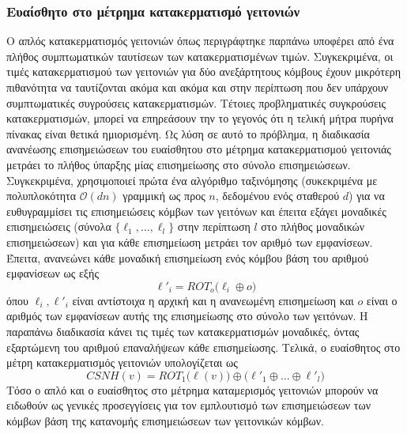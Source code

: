 \subsubsection{Ευαίσθητο στο μέτρημα κατακερματισμό γειτονιών}
Ο απλός κατακερματισμός γειτονιών όπως περιγράφτηκε παρπάνω υποφέρει από ένα πλήθος συμπτωματικών ταυτίσεων των κατακερματισμένων τιμών.
Συγκεκριμένα, οι τιμές κατακερματισμού των γειτονιών για δύο ανεξάρτητους κόμβους έχουν μικρότερη πιθανότητα να ταυτίζονται ακόμα και ακόμα και στην περίπτωση που δεν υπάρχουν συμπτωματικές συγρούσεις κατακερματισμών.
Τέτοιες προβληματικές συγκρούσεις κατακερματισμών, μπορεί να επηρεάσουν την το γεγονός ότι η τελική μήτρα πυρήνα πίνακας είναι θετικά ημιορισμένη.
Ως λύση σε αυτό το πρόβλημα, η διαδικασία ανανέωσης επισημειώσεων του ευαίσθητου στο μέτρημα κατακερματισμού γειτονιάς μετράει το πλήθος ύπαρξης μίας επισημείωσης στο σύνολο επισημειώσεων.
Συγκεκριμένα, χρησιμοποιεί πρώτα ένα αλγόριθμο ταξινόμησης (συκεκριμένα  με πολυπλοκότητα $\mathcal{O}(d n)$ γραμμική ως προς $n$, δεδομένου ενός σταθερού $d$) για να ευθυγραμμίσει τις  επισημειώσεις κόμβων των γειτόνων και έπειτα εξάγει μοναδικές επισημειώσεις (σύνολα $\{ \ell_1, \ldots, \ell_l \}$ στην περίπτωση $l$ στο πλήθος μοναδικών επισημειώσεων) και για κάθε επισημείωση μετράει τον αριθμό των εμφανίσεων.
Έπειτα, ανανεώνει κάθε μοναδική επισημείωση ενός κόμβου βάση του αριθμού εμφανίσεων ως εξής
\begin{equation}
    \ell'_i = ROT_o \big( \ell_i \oplus o \big)
\end{equation}
όπου $\ell_i, \ell'_i$ είναι αντίστοιχα η αρχική και η ανανεωμένη επισημείωση και $o$ είναι ο αριθμός των εμφανίσεων αυτής της επισημείωσης στο σύνολο των γειτόνων.
Η παραπάνω διαδικασία κάνει τις τιμές των κατακερματισμών μοναδικές, όντας εξαρτώμενη του αριθμού επαναλήψεων κάθε επισημείωσης.
Τελικά, ο ευαίσθητος στο μέτρη κατακερματισμός γειτονιών υπολογίζεται ως
\begin{equation}
    CSNH(v) = ROT_1 \big( \ell(v) \big) \oplus \big( \ell'_1 \oplus \ldots \oplus \ell'_l \big)
\end{equation}
Τόσο ο απλό και ο ευαίσθητος στο μέτρημα καταμερισμός γειτονιών μπορούν να ειδωθούν ως γενικές προσεγγίσεις για τον εμπλουτισμό των επισημειώσεων των κόμβων βάση της κατανομής επισημειώσεων των γειτονικών κόμβων.


